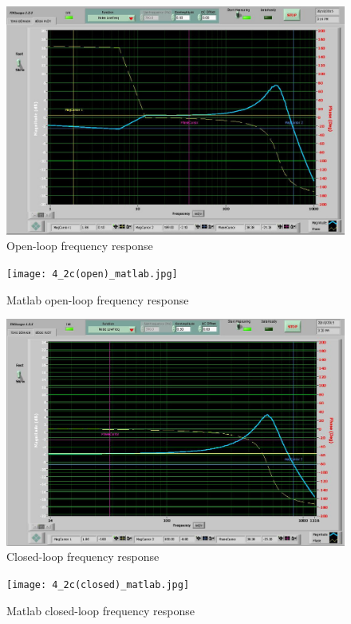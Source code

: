 \documentclass{article}
\begin{document}
\begin{figure}[ht]
\centering
\includegraphics[width=7in]{4_2c(open).jpg}
\caption{Open-loop frequency response}
\end{figure}

\begin{figure}[ht]
\centering
\texttt{[image: 4\_2c(open)\_matlab.jpg]}
\caption{Matlab open-loop frequency response}
\end{figure}

\begin{figure}[ht]
\centering
\includegraphics[width=7in]{4_2c(closed).jpg}
\caption{Closed-loop frequency response}
\end{figure}

\begin{figure}[ht]
\centering
\texttt{[image: 4\_2c(closed)\_matlab.jpg]}
\caption{Matlab closed-loop frequency response}
\end{figure}
\end{document}
